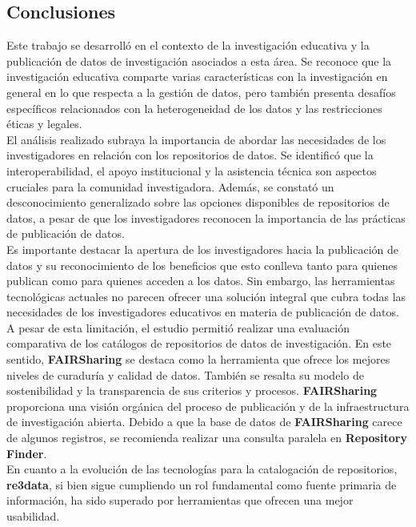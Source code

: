 \documentclass[runningheads]{llncs}
\begin{document}
\subsection*{Conclusiones}

Este trabajo se desarrolló en el contexto de la investigación educativa y la publicación de datos de investigación asociados a esta área. Se reconoce que la investigación educativa comparte varias características con la investigación en general en lo que respecta a la gestión de datos, pero también presenta desafíos específicos relacionados con la heterogeneidad de los datos y las restricciones éticas y legales.\\

El análisis realizado subraya la importancia de abordar las necesidades de los investigadores en relación con los repositorios de datos. Se identificó que la interoperabilidad, el apoyo institucional y la asistencia técnica son aspectos cruciales para la comunidad investigadora. Además, se constató un desconocimiento generalizado sobre las opciones disponibles de repositorios de datos, a pesar de que los investigadores reconocen la importancia de las prácticas de publicación de datos.\\

Es importante destacar la apertura de los investigadores hacia la publicación de datos y su reconocimiento de los beneficios que esto conlleva tanto para quienes publican como para quienes acceden a los datos. Sin embargo, las herramientas tecnológicas actuales no parecen ofrecer una solución integral que cubra todas las necesidades de los investigadores educativos en materia de publicación de datos.\\

A pesar de esta limitación, el estudio permitió realizar una evaluación comparativa de los catálogos de repositorios de datos de investigación. En este sentido, \textbf{FAIRSharing} se destaca como la herramienta que ofrece los mejores niveles de curaduría y calidad de datos. También se resalta su modelo de sostenibilidad y la transparencia de sus criterios y procesos. \textbf{FAIRSharing} proporciona una visión orgánica del proceso de publicación y de la infraestructura de investigación abierta. Debido a que la base de datos de \textbf{FAIRSharing} carece de algunos registros, se recomienda realizar una consulta paralela en \textbf{Repository Finder}.\\

En cuanto a la evolución de las tecnologías para la catalogación de repositorios, \textbf{re3data}, si bien sigue cumpliendo un rol fundamental como fuente primaria de información, ha sido superado por herramientas que ofrecen una mejor usabilidad.\\
\end{document}
